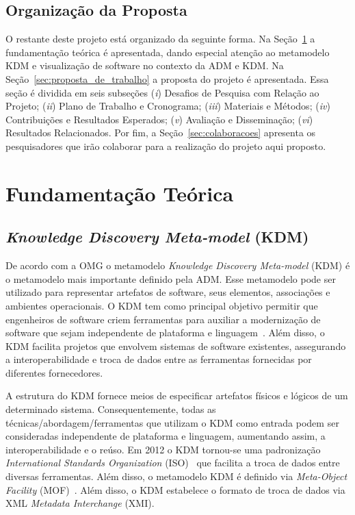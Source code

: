 \documentclass[12pt]{article}
\begin{document}
\subsection{Organização da Proposta}

O restante deste projeto está organizado da seguinte forma. Na Seção~\ref{sec:fundamentacao_teorica} a fundamentação teórica é apresentada, dando especial atenção ao metamodelo KDM e visualização de software no contexto da ADM e KDM. Na Seção~\ref{sec:proposta_de_trabalho} a proposta do projeto é apresentada. Essa seção é dividida em seis subseções (\textit{i}) Desafios de Pesquisa com Relação ao Projeto; (\textit{ii}) Plano de Trabalho e Cronograma; (\textit{iii}) Materiais e Métodos; (\textit{iv}) Contribuições e Resultados Esperados; (\textit{v}) Avaliação e Disseminação; (\textit{vi}) Resultados Relacionados. Por fim, a Seção~\ref{sec:colaboracoes} apresenta os pesquisadores que irão colaborar para a realização do projeto aqui proposto.

\section{Fundamentação Teórica}\label{sec:fundamentacao_teorica}

\subsection{\textit{Knowledge Discovery Meta-model} (KDM)}

De acordo com a OMG o metamodelo \textit{Knowledge Discovery Meta-model} (KDM) é o metamodelo mais importante definido pela ADM. Esse metamodelo pode ser utilizado para representar artefatos de software, seus elementos, associações e ambientes operacionais. O KDM tem como principal objetivo permitir que engenheiros de software criem ferramentas para auxiliar a modernização de software que sejam independente de plataforma e linguagem~\cite{PerezCastillo:2011jo, ADMCHAPTERR}. Além disso, o KDM facilita projetos que envolvem sistemas de software existentes, assegurando a interoperabilidade e troca de dados entre as ferramentas fornecidas por diferentes fornecedores. 

A estrutura do KDM fornece meios de especificar artefatos físicos e lógicos de um determinado sistema. Consequentemente, todas as técnicas/abordagem/ferramentas que utilizam o KDM como entrada podem ser consideradas independente de plataforma e linguagem, aumentando assim, a interoperabilidade e o reúso. Em 2012 o KDM tornou-se uma padronização \textit{International Standards Organization} (ISO)~\cite{KDM:specification} que facilita a troca de dados entre diversas ferramentas. Além disso, o metamodelo KDM é definido via \textit{Meta-Object Facility} (MOF)~\cite{MOF}. Além disso, o KDM estabelece o formato de troca de dados via XML \textit{Metadata Interchange} (XMI).
\end{document}
